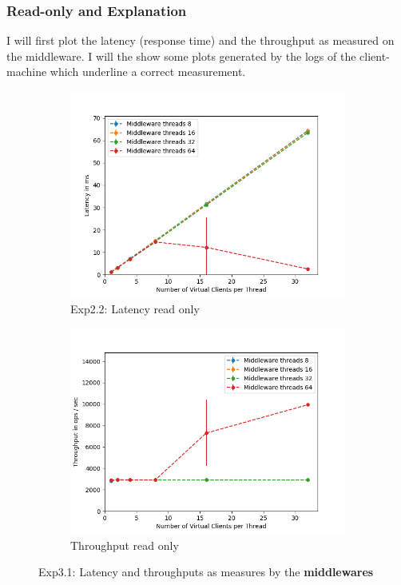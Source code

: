 \documentclass[11pt,a4paper]{article}
\begin{document}
\subsubsection{Read-only and Explanation}
I will first plot the latency (response time) and the throughput as measured on the middleware.
I will the show some plots generated by the logs of the client-machine which underline a correct measurement.

\begin{figure}[H]
\centering
\begin{subfigure}{.5\textwidth}
    \centering
    \includegraphics[width=\textwidth]{img/exp3_1/exp3_1__latency_middleware_write_0.png}
    \caption{Exp2.2: Latency read only}
    \label{fig:mesh1}
\end{subfigure}%
\begin{subfigure}{.5\textwidth}
      \centering
    \includegraphics[width=\textwidth]{img/exp3_1/exp3_1__throughput_middleware_write_0.png}
    \caption{Throughput read only}
    \label{fig:mesh1}
\end{subfigure}
\caption{Exp3.1: Latency and throughputs as measures by the \textbf{middlewares}}
\label{fig:test}
\end{figure}
\end{document}
